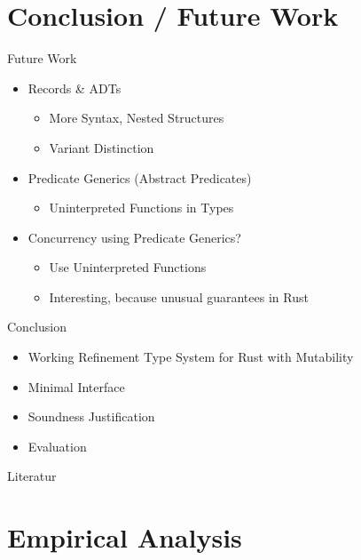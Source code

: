 \documentclass{sdqbeamer}
\begin{document}
\section{Conclusion / Future Work}


\begin{frame}{Future Work}
  \begin{itemize}
    \item Records \& ADTs 
    \begin{itemize}
      \item More Syntax, Nested Structures
      \item Variant Distinction
    \end{itemize}
    \item Predicate Generics (Abstract Predicates)
      \begin{itemize}
        \item Uninterpreted Functions in Types
      \end{itemize}
    \item Concurrency using Predicate Generics?
      \begin{itemize}
        \item Use Uninterpreted Functions
        \item Interesting, because unusual guarantees in Rust
      \end{itemize}
  \end{itemize}
\end{frame}

\begin{frame}{Conclusion}
  \begin{itemize}
    \item Working Refinement Type System for Rust with Mutability
    \item Minimal Interface
    \item Soundness Justification
    \item Evaluation
  \end{itemize}
\end{frame}


\begin{frame}[allowframebreaks]{Literatur}
  \tiny{
    \printbibliography
  }
\end{frame}

\appendix

\beginbackup


\section{Empirical Analysis}
\end{document}
